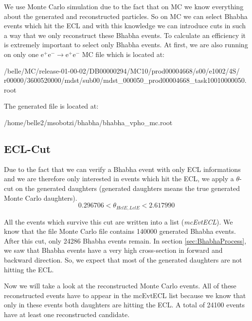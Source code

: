 \documentclass[a4paper,11pt,twosided,final,german,openbib,pdftex,listof=totoc,bibliography=totoc]{scrbook}
\begin{document}
We use Monte Carlo simulation due to the fact that on MC we know everything about the generated and reconstructed particles. So on MC we can select Bhabha events which hit the ECL and with this knowledge we can introduce cuts in such a way that we only reconstruct these Bhabha events. To calculate an efficiency it is extremely  important to select only Bhabha events. At first, we are also running on only one $\textrm{e}^+ \textrm{e}^- \rightarrow \textrm{e}^+ \textrm{e}^-$ MC file which is located at:
\newline

/belle/MC/release-01-00-02/DB00000294/MC10/prod00004668/s00/e1002/4S/
r00000/3600520000/mdst/sub00/mdst\_000050\_prod00004668\_task10010000050.root
\newline

The generated file is located at:

 /home/belle2/msobotzi/bhabha/bhabha\_vpho\_mc.root
\newline


\subsection{ECL-Cut}

Due to the fact that we can verify a Bhabha event with only ECL informations and we are therefore only interested in events which hit the ECL, we apply a $\theta$-cut on the generated daughters (generated daughters means the true generated Monte Carlo daughters). 
\begin{equation}
	0.296706 < \theta_{HclE,LclE} < 2.617990
\end{equation}

All the events which survive this cut are written into a list (\textit{mcEvtECL}). We know that the file Monte Carlo file contains 140000 generated Bhabha events. After this cut, only 24286 Bhabha events remain.
In section \ref{sec:BhabhaProcess}, we saw that Bhabha events have a very high cross-section in forward and backward  direction. So, we expect that most of the generated daughters are not hitting the ECL. 
\newline





Now we will take a look at the reconstructed Monte Carlo events. All of these reconstructed events have to appear in the mcEvtECL list because we know that only in these events both daughters are hitting the ECL. A total of 24100 events have at least one reconstructed candidate.
\end{document}

